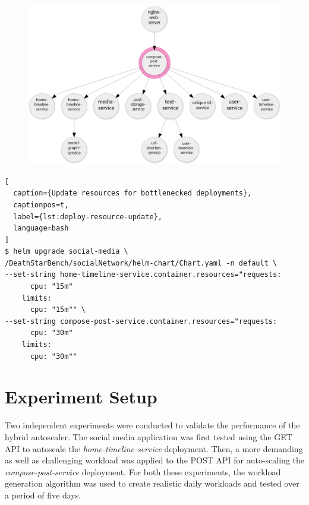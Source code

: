 \begin{figure}[htb]
    \begin{minipage}{0.75\linewidth}
        \includegraphics[width=1.0\linewidth]{Figures/Compose-Post-POST-Trace.pdf}
    \end{minipage}
\end{figure}

\begin{lstlisting}[
  caption={Update resources for bottlenecked deployments},
  captionpos=t,
  label={lst:deploy-resource-update},
  language=bash
]
$ helm upgrade social-media \
/DeathStarBench/socialNetwork/helm-chart/Chart.yaml -n default \
--set-string home-timeline-service.container.resources="requests: 
      cpu: "15m"
    limits:
      cpu: "15m"" \
--set-string compose-post-service.container.resources="requests: 
      cpu: "30m"
    limits:
      cpu: "30m""
\end{lstlisting}

\section{Experiment Setup}
\label{sec:ch6-exp-setup}

Two independent experiments were conducted to validate the performance of the hybrid autoscaler. The social media application was first tested using the GET API to autoscale the \textit{home-timeline-service} deployment. Then, a more demanding as well as challenging workload was applied to the POST API for auto-scaling the \textit{compose-post-service} deployment. For both these experiments, the workload generation algorithm was used to create realistic daily workloads and tested over a period of five days.

